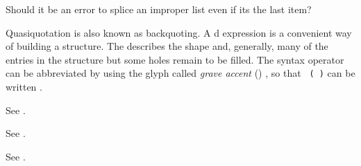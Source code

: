 \gdef\module{syntax-0}
\label{backquote}
%
\begin{optPrivate}
    Should it be an error to splice an improper list even if its the last item?
\end{optPrivate}
%
\begin{optDefinition}

%
\Syntax
{}%
%
\remarks%
Quasiquotation is also known as backquoting.  A d
expression is a convenient way of building a structure.  The 
describes the shape and, generally, many of the entries in the structure but
some holes remain to be filled.  The  syntax operator can
be abbreviated by using the glyph called {\em grave accent} ()
, so that {\tt
    ( )} can be written
.

%
\remarks%
See .

\Syntax
{}%
%
\remarks%
See .

\syntaxform{,}
%
\remarks%
See .


\end{optDefinition}
